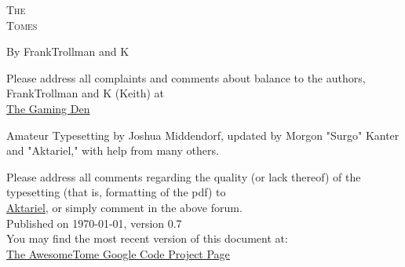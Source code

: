\pagestyle{plain}

\begin{center} \Huge

\textsc{The\\
Tomes\\
}\end{center}

\vspace{2cm}
\begin{center}\large By FrankTrollman and K\end{center}

\newpage

\vspace*{4in}

\noindent Please address all complaints and comments about balance to the authors, FrankTrollman and K (Keith) at\\
{\color{linkblue} \href{http://tgdmb.com/viewforum.php?f=1}{The Gaming Den}}

\vspace{0.2in}



\noindent Amateur Typesetting by Joshua Middendorf, updated by Morgon "Surgo" Kanter and "Aktariel," with help from many others.\\

\vspace{0.15in}

\noindent Please address all comments regarding the quality (or lack thereof) of the typesetting (that is, formatting of the pdf) to\\ 
\href{mailto:aktariel@gmail.com}{Aktariel}, or simply comment in the above forum.\\





\vspace{1in}
\noindent Published on \today, version 0.7\\
\noindent You may find the most recent version of this document at:\\
{\color{blue} \href{http://code.google.com/p/awesometome/downloads/list}{The AwesomeTome Google Code Project Page}}

\newpage
